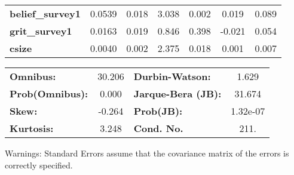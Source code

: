 \documentclass{report}
\begin{document}
\begin{center}
\begin{tabular}{lcccccc}
\textbf{belief\_survey1} &       0.0539  &        0.018     &     3.038  &         0.002        &        0.019    &        0.089     \\
\textbf{grit\_survey1}   &       0.0163  &        0.019     &     0.846  &         0.398        &       -0.021    &        0.054     \\
\textbf{csize}           &       0.0040  &        0.002     &     2.375  &         0.018        &        0.001    &        0.007     \\
\bottomrule
\end{tabular}
\begin{tabular}{lclc}
\textbf{Omnibus:}       & 30.206 & \textbf{  Durbin-Watson:     } &    1.629  \\
\textbf{Prob(Omnibus):} &  0.000 & \textbf{  Jarque-Bera (JB):  } &   31.674  \\
\textbf{Skew:}          & -0.264 & \textbf{  Prob(JB):          } & 1.32e-07  \\
\textbf{Kurtosis:}      &  3.248 & \textbf{  Cond. No.          } &     211.  \\
\bottomrule
\end{tabular}
\end{center}

Warnings: \newline
 [1] Standard Errors assume that the covariance matrix of the errors is correctly specified.
\end{document}
